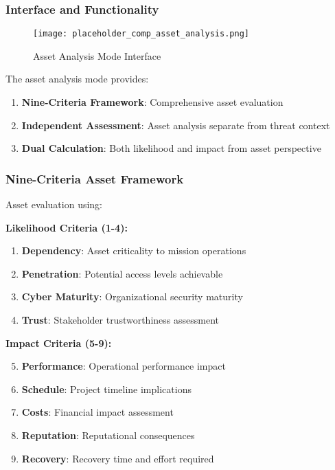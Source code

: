 \documentclass[binding=0.6cm]{sapthesis}
\begin{document}
\subsubsection{Interface and Functionality}

\begin{figure}[H]
    \centering
    \texttt{[image: placeholder\_comp\_asset\_analysis.png]}
    \caption{Asset Analysis Mode Interface}
    \label{fig:comp_asset_analysis}
\end{figure}

The asset analysis mode provides:
\begin{enumerate}
    \item \textbf{Nine-Criteria Framework}: Comprehensive asset evaluation
    \item \textbf{Independent Assessment}: Asset analysis separate from threat context
    \item \textbf{Dual Calculation}: Both likelihood and impact from asset perspective
\end{enumerate}

\subsubsection{Nine-Criteria Asset Framework}
Asset evaluation using:

\textbf{Likelihood Criteria (1-4):}
\begin{enumerate}
    \item \textbf{Dependency}: Asset criticality to mission operations
    \item \textbf{Penetration}: Potential access levels achievable
    \item \textbf{Cyber Maturity}: Organizational security maturity
    \item \textbf{Trust}: Stakeholder trustworthiness assessment
\end{enumerate}

\textbf{Impact Criteria (5-9):}
\begin{enumerate}
    \setcounter{enumi}{4}
    \item \textbf{Performance}: Operational performance impact
    \item \textbf{Schedule}: Project timeline implications
    \item \textbf{Costs}: Financial impact assessment
    \item \textbf{Reputation}: Reputational consequences
    \item \textbf{Recovery}: Recovery time and effort required
\end{enumerate}
\end{document}
